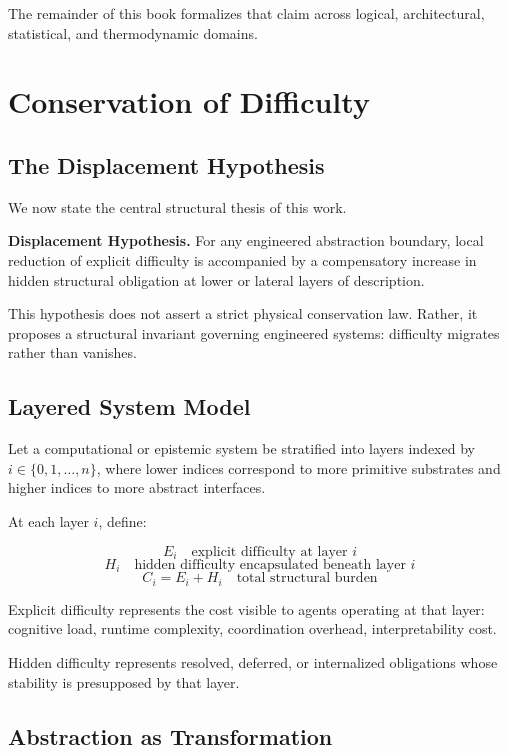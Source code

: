 \documentclass[11pt,openany]{book}
\begin{document}
The remainder of this book formalizes that claim across logical,
architectural, statistical, and thermodynamic domains.

\chapter{Conservation of Difficulty}

\section{The Displacement Hypothesis}

We now state the central structural thesis of this work.

\medskip

\textbf{Displacement Hypothesis.} 
For any engineered abstraction boundary, local reduction of explicit difficulty 
is accompanied by a compensatory increase in hidden structural obligation 
at lower or lateral layers of description.

\medskip

This hypothesis does not assert a strict physical conservation law. 
Rather, it proposes a structural invariant governing engineered systems: 
difficulty migrates rather than vanishes.

\section{Layered System Model}

Let a computational or epistemic system be stratified into layers 
indexed by $i \in \{0,1,\dots,n\}$, where lower indices correspond to 
more primitive substrates and higher indices to more abstract interfaces.

At each layer $i$, define:

\[
E_i \quad \text{explicit difficulty at layer } i
\]
\[
H_i \quad \text{hidden difficulty encapsulated beneath layer } i
\]
\[
C_i = E_i + H_i \quad \text{total structural burden}
\]

Explicit difficulty represents the cost visible to agents operating at that layer:
cognitive load, runtime complexity, coordination overhead, interpretability cost.

Hidden difficulty represents resolved, deferred, or internalized obligations 
whose stability is presupposed by that layer.

\section{Abstraction as Transformation}
\end{document}
